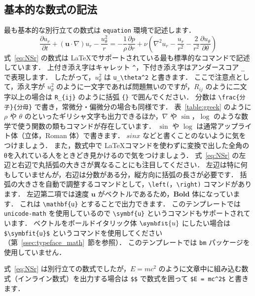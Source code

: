 \subsection{基本的な数式の記法}
\label{ssec:basic_command}

最も基本的な別行立ての数式は \verb|equation| 環境で記述します．
\begin{equation}
    \frac{\partial u_r}{\partial t} + (\mathbf{u}\cdot\nabla)u_r - \frac{u_\theta^2}{r} = -\frac{1}{\rho}\frac{\partial p}{\partial r} + \nu\left(\nabla^2 u_r - \frac{u_r}{r^2} - \frac{2}{r^2}\frac{\partial u_\theta}{\partial \theta}\right)
    \label{eq:NSr}
\end{equation}
式~\eqref{eq:NSr} の数式は \LaTeX でサポートされている最も標準的なコマンドで記述しています．
上付き添え字はキャレット \verb|^|，下付き添え字はアンダースコア \verb|_| で表現します．
したがって，$u_\theta^2$ は \verb|u_\theta^2| と書きます．
ここで注意点として，添え字が $u_\theta^2$ のように一文字であれば問題無いのですが，$R_{ij}$ のように二文字以上の場合は \verb|R_{ij}| のように括弧 \verb|{}| で囲んでください．
分数は \verb|\frac{分子}{分母}| で書き，常微分・偏微分の場合も同様です．
表~\ref{table:greek} のように $\rho$ や $\theta$ のといったギリシャ文字も出力できるほか，$\nabla$ や $\sin$，$\log$ のような数学で使う関数の類もコマンドが存在しています．
$\sin$ や $\log$ は通常アップライト体（立体，Roman 体）で書きます．
$sin x$ などと書くことのないように気をつけましょう．
また，数式中で \LaTeX コマンドを使わずに変換で出した全角のθを入れている人をときどき見かけるので気をつけましょう．
式~\eqref{eq:NSr} の左辺と右辺で丸括弧の大きさが異なることにも注目してください．
左辺は特に何もしていませんが，右辺は分数がある分，縦方向に括弧の長さが必要です．
括弧の大きさを自動で調整するコマンドとして，\verb|\left(|，\verb|\right)| コマンドがあります．
左辺第二項では速度 $\mathbf{u}$ がベクトルであるため，\textbf{Bold} 体になっています．
これは \verb|\mathbf{u}| とすることで出力できます．
このテンプレートでは \verb|unicode-math| を使用しているので \verb|\symbf{u}| というコマンドもサポートされています．
ベクトルをボールドイタリック体 $\symbfit{u}$ にしたい場合は \verb|$\symbfit{u}$| というコマンドを使用してください（第~\ref{ssec:typeface_math}~節を参照）．
このテンプレートでは \verb|bm| パッケージを使用していません．

式~\eqref{eq:NSr} は別行立ての数式でしたが，$E = mc^2$ のように文章中に組み込む数式（インライン数式）を出力する場合は \verb|$$| で数式を囲って \verb|$E = mc^2$| と書きます．

